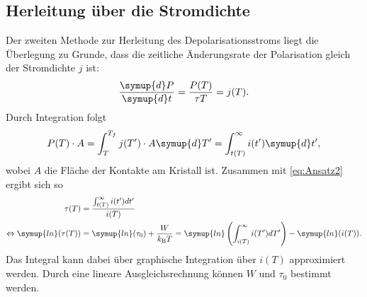 \subsection{Herleitung über die Stromdichte}
\label{sec:Herleitung_Stromdichte}
Der zweiten Methode zur Herleitung des Depolarisationsstroms liegt die Überlegung zu Grunde, dass die zeitliche Änderungsrate der Polarisation gleich der Stromdichte $j$ ist:
\begin{equation}
    \label{eq:Ansatz2}
    \frac{\symup{d}P}{\symup{d}t} = \frac{P(T)}{\tau{T}} = j(T).
\end{equation}
Durch Integration folgt 
\begin{equation*}
    P(T) \cdot A = \int_T^{T_f} j(T') \cdot A \symup{d}T' = \int_{t(T)}^\infty i(t') \symup{d}t',
\end{equation*}
wobei $A$ die Fläche der Kontakte am Kristall ist. Zusammen mit \autoref{eq:Ansatz2} ergibt sich so 
\begin{align}
    \tau(T) &= \frac{\int_{t(T)}^{\infty} i(t') dt'}{i(T)} \nonumber \\
    \Leftrightarrow \symup{ln}(\tau(T)) &= \symup{ln}(\tau_0) + \frac{W}{k_\text{B}T} = \symup{ln}\left(\int_{i(T)}^\infty i(T')dT' \right) - \symup{ln}(i(T)).
    \label{eq:W_tau0}
\end{align}
Das Integral kann dabei über graphische Integration über $i(T)$ approximiert werden. Durch eine lineare Ausgleichsrechnung können $W$ und $\tau_0$ bestimmt werden.
